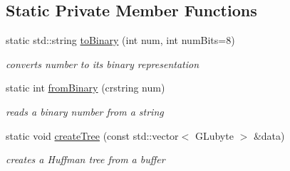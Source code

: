 \subsection*{Static Private Member Functions}
\begin{DoxyCompactItemize}
\item 
\mbox{\label{classnta_1_1Compressor_affed498c6ed43db813de5c46892b9163}} 
static std\+::string \hyperlink{classnta_1_1Compressor_affed498c6ed43db813de5c46892b9163}{to\+Binary} (int num, int num\+Bits=8)
\begin{DoxyCompactList}\small\item\em converts number to its binary representation \end{DoxyCompactList}\item 
\mbox{\label{classnta_1_1Compressor_aa7950ec19d7beda1b1102d1df453861f}} 
static int \hyperlink{classnta_1_1Compressor_aa7950ec19d7beda1b1102d1df453861f}{from\+Binary} (crstring num)
\begin{DoxyCompactList}\small\item\em reads a binary number from a string \end{DoxyCompactList}\item 
\mbox{\label{classnta_1_1Compressor_ade1d9da3d6a4ccc45fb17a83f9d7c4ed}} 
static void \hyperlink{classnta_1_1Compressor_ade1d9da3d6a4ccc45fb17a83f9d7c4ed}{create\+Tree} (const std\+::vector$<$ G\+Lubyte $>$ \&data)
\begin{DoxyCompactList}\small\item\em creates a Huffman tree from a buffer \end{DoxyCompactList}\end{DoxyCompactItemize}
